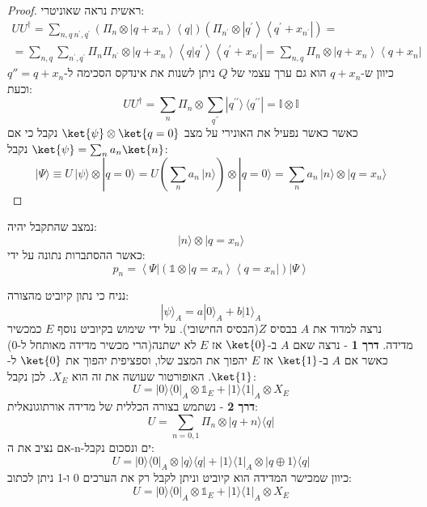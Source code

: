 \documentclass{tstextbook}
\begin{document}
\begin{proof}
ראשית נראה שאוניטרי:
$$\begin{gather}U U^{\dagger}=\!\!\!\sum_{n,q\ n^{\prime},q^{\prime}}\left(\Pi_{n}\otimes\left|q+x_{n}\right\rangle\left\langle q\right|\right)\left(\Pi_{n^{\prime}}\otimes\left|q^{\prime}\right\rangle\left\langle q^{\prime}+x_{n^{\prime}}\right|\right)=\\=\sum_{n,q}\sum_{n^{\prime},q^{\prime}}\Pi_{n}\Pi_{n^{\prime}}\otimes\left|q+x_{n}\right\rangle\left\langle q|q^{\prime}\right\rangle\left\langle q^{\prime}+x_{n^{\prime}}\right|=\sum_{n,q}\Pi_{n}\otimes\left|q+x_{n}\right\rangle\left\langle q+x_{n}\right| 
\end{gather}$$
כיוון ש-\(q+x_{n}\) הוא גם ערך עצמי של \(Q\) ניתן לשנות את אינדקס הסכימה ל-\(q''=q+x_{n}\) וכעת:
$$U U^{\dagger}=\sum_{n}\Pi_{n}\otimes\sum_{q^{\prime\prime}}|q^{\prime\prime}\rangle\,\langle q^{\prime\prime}|=\mathbb{I}\otimes\mathbb{I}$$
כאשר כאשר נפעיל את האונירי על מצב \(\ket{\psi}\otimes \ket{q=0}\) נקבל כי אם \(\ket{\psi}=\sum_{n}a_{n}\ket{n}\) נקבל:
$$|\Psi\rangle\equiv U\,|\psi\rangle\!\otimes\!|q=0\rangle=U\left(\sum_{n}a_{n}\,|n\rangle\right)\!\otimes\!|q=0\rangle=\sum_{n}a_{n}\,|n\rangle\!\otimes\!|q=x_{n}\rangle$$

\end{proof}
\begin{corollary}
נמצב שהתקבל יהיה:
$$|n\rangle\otimes|q=x_{n}\rangle$$
כאשר ההסתברות נתונה על ידי:
$$p_{n}=\left\langle\Psi\right|\left(\mathbb{1}\otimes\left|q=x_{n}\right\rangle\left\langle q=x_{n}\right|\right)\left|\Psi\right\rangle$$

\end{corollary}
\begin{example}
נניח כי נתון קיוביט מהצורה:
$$|\psi\rangle_{A}=a|0\rangle_{A}+b|1\rangle_{A}$$
נרצה למדוד את \(A\) בבסיס \(Z\)(הבסיס החישובי). על ידי שימוש בקיוביט נוסף \(E\) כמכשיר מדידה.
\textbf{דרך 1} - נרצה שאם \(A\) ב-\(\ket{0}\) אז \(E\) לא ישתנה(הרי מכשיר מדידה מאותחל ל-0) כאשר אם \(A\) ב-\(\ket{1}\) אז \(E\) יהפוך את המצב שלו, וספציפית יהפוך את \(\ket{0}\) ל-\(\ket{1}\). האופורטור שעושה את זה הוא \(X_{E}\). לכן נקבל:
$$U=|0\rangle\langle0|_{A}\otimes \mathbb{1}_{E}+|1\rangle\langle1|_{A}\otimes X_{E}$$\textbf{דרך 2} - נשתמש בצורה הכללית של מדידה אורתוגונאלית:
$$U=\sum_{n=0,1}\Pi_{n}\otimes|q+n\rangle\langle q|$$
אם נציב את ה-n-ים ונסכום נקבל:
$$U=|0\rangle\langle0|_{A}\otimes|q\rangle\langle q|+|1\rangle\langle1|_{A}\otimes|q\oplus1\rangle\langle q|$$
כיוון שמכישר המדידה הוא קיוביט וניתן לקבל רק את הערכים 0 ו-1 ניתן לכתוב:
$$U=|0\rangle\langle0|_{A}\otimes \mathbb{1}_{E}+|1\rangle\langle1|_{A}\otimes X_{E}$$

\end{example}
\end{document}

